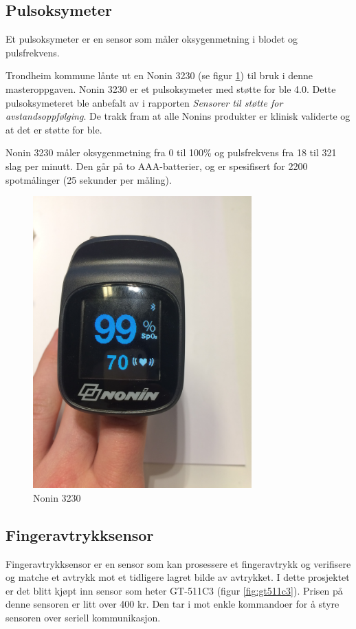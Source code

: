 \subsection{Pulsoksymeter}
Et pulsoksymeter er en sensor som måler oksygenmetning i blodet og pulsfrekvens.

Trondheim kommune lånte ut en Nonin 3230 (se figur \ref{fig:nonin-3230}) til bruk i denne masteroppgaven.
Nonin 3230 er et pulsoksymeter med støtte for \gls{ble} 4.0. Dette pulsoksymeteret ble anbefalt av \citet{austad2016sensorer}
i rapporten \textit{Sensorer til støtte for avstandsoppfølging}. De trakk fram at alle Nonins produkter
er klinisk validerte og at det er støtte for \gls{ble}. %

Nonin 3230 måler oksygenmetning fra 0 til 100\% og pulsfrekvens fra 18 til 321 slag per minutt. Den går på to
AAA-batterier, og er spesifisert for 2200 spotmålinger (25 sekunder per måling).

\begin{figure}
\includegraphics[width=0.75\textwidth, center]{fig/prototype/nonin3230ble}
\caption{Nonin 3230}
\label{fig:nonin-3230}
\end{figure}

\subsection{Fingeravtrykksensor}
Fingeravtrykksensor er en sensor som kan prosessere et fingeravtrykk og verifisere og matche et avtrykk mot
et tidligere lagret bilde av avtrykket. I dette prosjektet er det blitt kjøpt inn sensor som heter GT-511C3 (figur \ref{fig:gt511c3}).
Prisen på denne sensoren er litt over 400 kr. Den tar i mot enkle kommandoer for å styre sensoren over seriell kommunikasjon.

